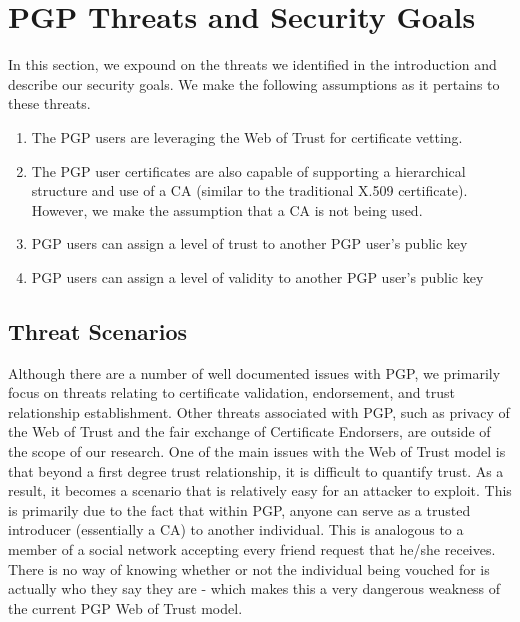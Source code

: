 \documentclass{llncs}
\begin{document}
\section{PGP Threats and Security Goals}
In this section, we expound on the threats we identified in the introduction and describe our security goals.  We make the following assumptions as it pertains to these threats.   
\begin{enumerate}
\item The PGP users are leveraging the Web of Trust for certificate vetting.
\item The PGP user certificates are also capable of supporting a hierarchical structure and use of a CA (similar to the traditional X.509 certificate).  However, we make the assumption that a CA is not being used.   
\item PGP users can assign a level of trust to another PGP user's public key
\item PGP users can assign a level of validity to another PGP user's public key
\end{enumerate} 

\subsection {Threat Scenarios}
Although there are a number of well documented issues with PGP, we primarily focus on threats relating to certificate validation, endorsement, and trust relationship establishment.  Other threats associated with PGP, such as privacy of the Web of Trust and the fair exchange of Certificate Endorsers, are outside of the scope of our research.  One of the main issues with the Web of Trust model is that beyond a first degree trust relationship, it is difficult to quantify trust.  As a result, it becomes a scenario that is relatively easy for an attacker to exploit.  This is primarily due to the fact that within PGP, anyone can serve as a trusted introducer (essentially a CA) to another individual. This is analogous to a member of a social network accepting every friend request that he/she receives.  There is no way of knowing whether or not the individual being vouched for is actually who they say they are - which makes this a very dangerous weakness of the current PGP Web of Trust model. 
\end{document}
